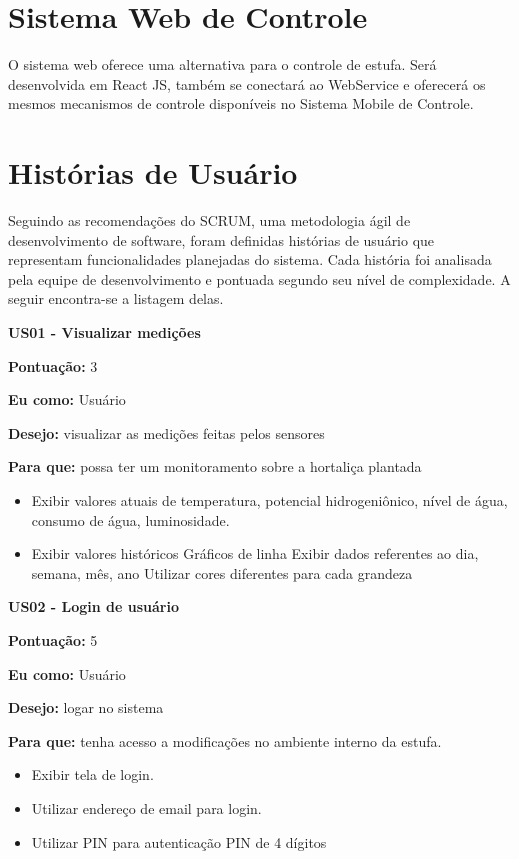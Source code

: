 \section{Sistema Web de Controle}

O sistema web oferece uma alternativa para o controle de estufa. Será desenvolvida em React JS, também se conectará ao WebService e oferecerá os mesmos mecanismos de controle disponíveis no Sistema Mobile de Controle.

\section{Histórias de Usuário}

Seguindo as recomendações do SCRUM, uma metodologia ágil de desenvolvimento de software, foram definidas histórias de usuário que representam funcionalidades planejadas do sistema. Cada história foi analisada pela equipe de desenvolvimento e pontuada segundo seu nível de complexidade. A seguir encontra-se a listagem delas.

\textbf{US01 - Visualizar medições}

\textbf{Pontuação:} 3

\textbf{Eu como:} Usuário

\textbf{Desejo:} visualizar as medições feitas pelos sensores

\textbf{Para que:} possa ter um monitoramento sobre a hortaliça plantada

\begin{itemize}
	\item Exibir valores atuais de temperatura, potencial hidrogeniônico, nível de água, consumo de água, luminosidade.
	\item Exibir valores históricos
		\subitem Gráficos de linha
		\subitem Exibir dados referentes ao dia, semana, mês, ano
		\subitem Utilizar cores diferentes para cada grandeza
\end{itemize}

\textbf{US02 - Login de usuário}

\textbf{Pontuação:} 5

\textbf{Eu como:} Usuário

\textbf{Desejo:} logar no sistema

\textbf{Para que:} tenha acesso a modificações no ambiente interno da estufa.

\begin{itemize}
	\item Exibir tela de login.
	\item Utilizar endereço de email para login.
	\item Utilizar PIN para autenticação
		\subitem PIN de 4 dígitos
\end{itemize}

